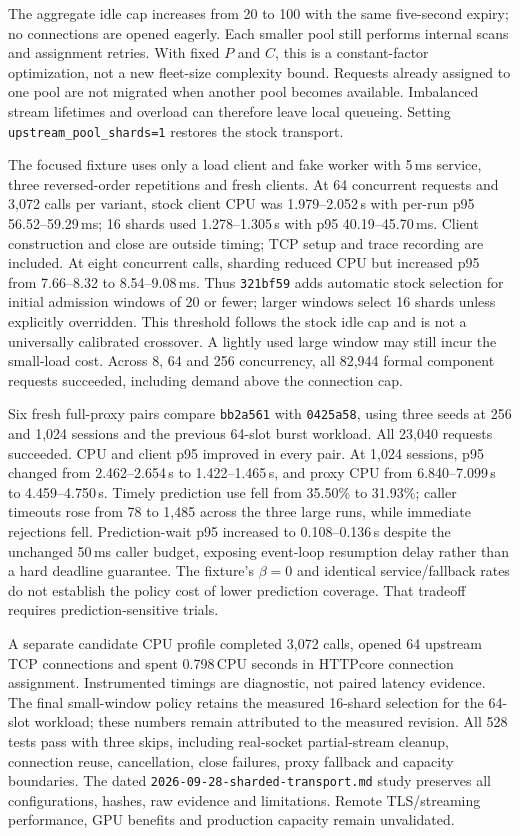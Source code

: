 The aggregate idle cap increases from 20 to 100 with the same five-second expiry;
no connections are opened eagerly. Each smaller pool still performs internal
scans and assignment retries. With fixed $P$ and $C$, this is a constant-factor
optimization, not a new fleet-size complexity bound. Requests already assigned
to one pool are not migrated when another pool becomes available. Imbalanced
stream lifetimes and overload can therefore leave local queueing. Setting
\texttt{upstream\_pool\_shards=1} restores the stock transport.

The focused fixture uses only a load client and fake worker with 5\,ms service,
three reversed-order repetitions and fresh clients. At 64 concurrent requests
and 3,072 calls per variant, stock client CPU was 1.979--2.052\,s with per-run p95
56.52--59.29\,ms; 16 shards used 1.278--1.305\,s with p95 40.19--45.70\,ms.
Client construction and close are outside timing; TCP setup and trace recording
are included. At eight concurrent calls, sharding reduced CPU but increased p95
from 7.66--8.32 to 8.54--9.08\,ms. Thus \texttt{321bf59} adds automatic stock
selection for initial admission windows of 20 or fewer; larger windows select
16 shards unless explicitly overridden. This threshold follows the stock idle
cap and is not a universally calibrated crossover. A lightly used large window
may still incur the small-load cost. Across 8, 64 and 256 concurrency, all 82,944
formal component requests succeeded, including demand above the connection cap.

Six fresh full-proxy pairs compare \texttt{bb2a561} with \texttt{0425a58}, using
three seeds at 256 and 1,024 sessions and the previous 64-slot burst workload.
All 23,040 requests succeeded. CPU and client p95 improved in every pair. At
1,024 sessions, p95 changed from 2.462--2.654\,s to 1.422--1.465\,s, and proxy CPU
from 6.840--7.099\,s to 4.459--4.750\,s. Timely prediction use fell from 35.50\%
to 31.93\%; caller timeouts rose from 78 to 1,485 across the three large runs,
while immediate rejections fell. Prediction-wait p95 increased to
0.108--0.136\,s despite the unchanged 50\,ms caller budget, exposing event-loop
resumption delay rather than a hard deadline guarantee. The fixture's
$\beta=0$ and identical service/fallback rates do not establish the policy cost
of lower prediction coverage. That tradeoff requires prediction-sensitive trials.

A separate candidate CPU profile completed 3,072 calls, opened 64 upstream TCP
connections and spent 0.798\,CPU seconds in HTTPcore connection assignment.
Instrumented timings are diagnostic, not paired latency evidence. The final
small-window policy retains the measured 16-shard selection for the 64-slot
workload; these numbers remain attributed to the measured revision. All 528
tests pass with three skips, including real-socket partial-stream cleanup,
connection reuse, cancellation, close failures, proxy fallback and capacity
boundaries. The dated \texttt{2026-09-28-sharded-transport.md} study preserves
all configurations, hashes, raw evidence and limitations. Remote TLS/streaming
performance, GPU benefits and production capacity remain unvalidated.

